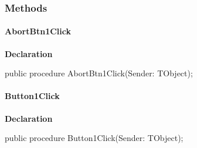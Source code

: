 \documentclass{report}
\newif\ifpdf
\begin{document}
\subsubsection*{\large{\textbf{Methods}}\normalsize\hspace{1ex}\hfill}
\paragraph*{AbortBtn1Click}\hspace*{\fill}

\label{igobase.TIWizFrm-AbortBtn1Click}
\begin{list}{}{
\setlength{\itemindent}{0cm}
\setlength{\listparindent}{0cm}
\setlength{\leftmargin}{\evensidemargin}
\addtolength{\leftmargin}{\tmplength}
\settowidth{\labelsep}{X}
\addtolength{\leftmargin}{\labelsep}
\setlength{\labelwidth}{\tmplength}
}
\item[\textbf{Declaration}\hfill]
\ifpdf
\begin{flushleft}
\fi
\begin{ttfamily}
public procedure AbortBtn1Click(Sender: TObject);\end{ttfamily}

\ifpdf
\end{flushleft}
\fi

\end{list}
\paragraph*{Button1Click}\hspace*{\fill}

\label{igobase.TIWizFrm-Button1Click}
\begin{list}{}{
\setlength{\itemindent}{0cm}
\setlength{\listparindent}{0cm}
\setlength{\leftmargin}{\evensidemargin}
\addtolength{\leftmargin}{\tmplength}
\settowidth{\labelsep}{X}
\addtolength{\leftmargin}{\labelsep}
\setlength{\labelwidth}{\tmplength}
}
\item[\textbf{Declaration}\hfill]
\ifpdf
\begin{flushleft}
\fi
\begin{ttfamily}
public procedure Button1Click(Sender: TObject);\end{ttfamily}

\ifpdf
\end{flushleft}
\fi

\end{list}
\end{document}
